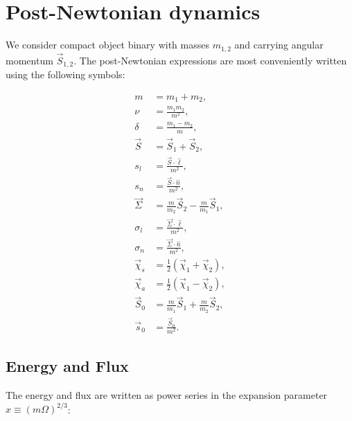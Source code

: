 \documentclass[aps,prd,amsmath,floatfix,twocolumn,superscriptaddress,nofootinbib,showpacs]{revtex4-1}
\newcommand{\ellHat}{\ensuremath{\hat{\ell}}}
\begin{document}
\section{Post-Newtonian dynamics}
\label{ap:PN}


We consider compact object binary with masses $m_{1,2}$ and carrying
angular momentum $\vec{S}_{1,2}$. The post-Newtonian expressions are
most conveniently written using the following symbols:

\begin{align}
m &= m_{1}+m_{2},\\
\nu &= \frac{m_{1}m_{2}}{m^{2}},\\
\delta &= \frac{m_{1}-m_{2}}{m},\\
\vec{S} &= \vec{S}_{1}+\vec{S}_{2},\\
s_{l} &= \frac{\vec{S}\cdot\hat\ell}{m^{2}},\\
s_{n} &= \frac{\vec{S}\cdot\hat n}{m^{2}},\\
\vec{\Sigma} &= \frac{m}{m_2}\vec{S}_{2} - \frac{m}{m_1}\vec{S}_{1},\\
\sigma_{l} &=\frac{\vec\Sigma\cdot\hat\ell}{m^{2}}, \\
\sigma_{n} &= \frac{\vec\Sigma\cdot\hat n}{m^{2}}, \\
\vec{\chi}_{s} &= \frac{1}{2}\left(\vec{\chi}_{1}+\vec{\chi}_{2}\right),\\
\vec{\chi}_{a} &= \frac{1}{2}\left(\vec{\chi}_{1}-\vec{\chi}_{2}\right),\\
\vec{S}_0 & = \frac{m}{m_1}\vec{S}_{1}+\frac{m}{m_2}\vec{S}_{2},\\
\vec{s}_0 & = \frac{\vec{S}_0}{m^2}.
\end{align}


\subsection{Energy and Flux}
\label{ap:energyFlux}

The energy and flux are written as power series in the expansion
parameter $x\equiv (m\Omega)^{2/3}$:
\end{document}
